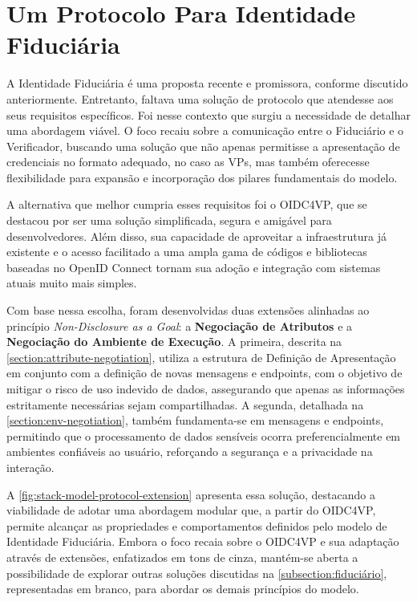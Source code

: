 \chapter{Um Protocolo Para Identidade Fiduciária}\label{ch:protocol}

A Identidade Fiduciária é uma proposta recente e promissora, conforme discutido anteriormente. Entretanto, faltava uma solução de protocolo que atendesse aos seus requisitos específicos. Foi nesse contexto que surgiu a necessidade de detalhar uma abordagem viável. O foco recaiu sobre a comunicação entre o Fiduciário e o Verificador, buscando uma solução que não apenas permitisse a apresentação de credenciais no formato adequado, no caso as \acs{VP}s, mas também oferecesse flexibilidade para expansão e incorporação dos pilares fundamentais do modelo.

A alternativa que melhor cumpria esses requisitos foi o \acs{OIDC4VP}, que se destacou por ser uma solução simplificada, segura e amigável para desenvolvedores. Além disso, sua capacidade de aproveitar a infraestrutura já existente e o acesso facilitado a uma ampla gama de códigos e bibliotecas baseadas no OpenID Connect tornam sua adoção e integração com sistemas atuais muito mais simples.

Com base nessa escolha, foram desenvolvidas duas extensões alinhadas ao princípio \emph{Non-Disclosure as a Goal}: a \textbf{Negociação de Atributos} e a \textbf{Negociação do Ambiente de Execução}. A primeira, descrita na \autoref{section:attribute-negotiation}, utiliza a estrutura de Definição de Apresentação em conjunto com a definição de novas mensagens e endpoints, com o objetivo de mitigar o risco de uso indevido de dados, assegurando que apenas as informações estritamente necessárias sejam compartilhadas. A segunda, detalhada na \autoref{section:env-negotiation}, também fundamenta-se em mensagens e endpoints, permitindo que o processamento de dados sensíveis ocorra preferencialmente em ambientes confiáveis ao usuário, reforçando a segurança e a privacidade na interação.

A \autoref{fig:stack-model-protocol-extension} apresenta essa solução, destacando a viabilidade de adotar uma abordagem modular que, a partir do \acs{OIDC4VP}, permite alcançar as propriedades e comportamentos definidos pelo modelo de Identidade Fiduciária. Embora o foco recaia sobre o \acs{OIDC4VP} e sua adaptação através de extensões, enfatizados em tons de cinza, mantém-se aberta a possibilidade de explorar outras soluções discutidas na \autoref{subsection:fiduciário}, representadas em branco, para abordar os demais princípios do modelo. 


